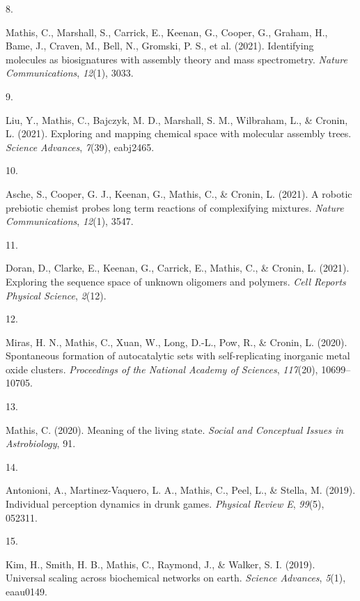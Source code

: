 \documentclass[11pt,a4paper,]{awesome-cv}
\newlength{\cslhangindent}
\newlength{\csllabelwidth}
\newenvironment{CSLReferences}[2] %
 {\begin{list}{}{%
  \setlength{\itemindent}{0pt}
  \setlength{\leftmargin}{0pt}
  \setlength{\parsep}{0pt}
  \ifodd #1
   \setlength{\leftmargin}{\cslhangindent}
   \setlength{\itemindent}{-1\cslhangindent}
  \fi
  \setlength{\itemsep}{#2\baselineskip}}}
 {\end{list}}
\newcommand{\CSLBlock}[1]{\hfill\break\parbox[t]{\linewidth}{\strut\ignorespaces#1\strut}}
\newcommand{\CSLLeftMargin}[1]{\parbox[t]{\csllabelwidth}{\strut#1\strut}}
\newcommand{\CSLRightInline}[1]{\parbox[t]{\linewidth - \csllabelwidth}{\strut#1\strut}}
\begin{document}
\begin{CSLReferences}{0}{0}
\CSLLeftMargin{8. }%
\CSLRightInline{Mathis, C., Marshall, S., Carrick, E., Keenan, G.,
Cooper, G., Graham, H., Bame, J., Craven, M., Bell, N., Gromski, P. S.,
et al. (2021). Identifying molecules as biosignatures with assembly
theory and mass spectrometry. \emph{Nature Communications},
\emph{12}(1), 3033.
\CSLBlock{*}}

\CSLLeftMargin{9. }%
\CSLRightInline{Liu, Y., Mathis, C., Bajczyk, M. D., Marshall, S. M.,
Wilbraham, L., \& Cronin, L. (2021). Exploring and mapping chemical
space with molecular assembly trees. \emph{Science Advances},
\emph{7}(39), eabj2465.}

\CSLLeftMargin{10. }%
\CSLRightInline{Asche, S., Cooper, G. J., Keenan, G., Mathis, C., \&
Cronin, L. (2021). A robotic prebiotic chemist probes long term
reactions of complexifying mixtures. \emph{Nature Communications},
\emph{12}(1), 3547.}

\CSLLeftMargin{11. }%
\CSLRightInline{Doran, D., Clarke, E., Keenan, G., Carrick, E., Mathis,
C., \& Cronin, L. (2021). Exploring the sequence space of unknown
oligomers and polymers. \emph{Cell Reports Physical Science},
\emph{2}(12).}

\CSLLeftMargin{12. }%
\CSLRightInline{Miras, H. N., Mathis, C., Xuan, W., Long, D.-L., Pow,
R., \& Cronin, L. (2020). Spontaneous formation of autocatalytic sets
with self-replicating inorganic metal oxide clusters. \emph{Proceedings
of the National Academy of Sciences}, \emph{117}(20), 10699--10705.}

\CSLLeftMargin{13. }%
\CSLRightInline{Mathis, C. (2020). Meaning of the living state.
\emph{Social and Conceptual Issues in Astrobiology}, 91.}

\CSLLeftMargin{14. }%
\CSLRightInline{Antonioni, A., Martinez-Vaquero, L. A., Mathis, C.,
Peel, L., \& Stella, M. (2019). Individual perception dynamics in drunk
games. \emph{Physical Review E}, \emph{99}(5), 052311.}

\CSLLeftMargin{15. }%
\CSLRightInline{Kim, H., Smith, H. B., Mathis, C., Raymond, J., \&
Walker, S. I. (2019). Universal scaling across biochemical networks on
earth. \emph{Science Advances}, \emph{5}(1), eaau0149.}


\end{CSLReferences}
\end{document}
